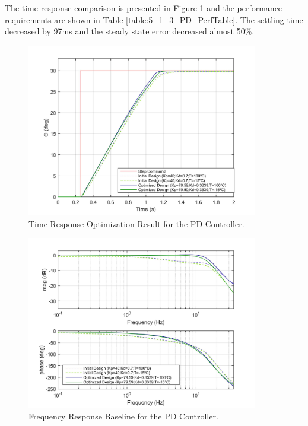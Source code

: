 The time response comparison is presented in Figure \ref{fig:5_1_3_PD_TimeResp} and the performance requirements are shown in Table \ref{table:5_1_3_PD_PerfTable}. The settling time decreased by 97ms and the steady state error decreased almost 50\%.

\begin{figure}[H]
	\centering
	\centerline{\includegraphics[width=0.9\textwidth]{Figuras/5.OptimizationResults/5-1-3-PD-TimeResponseComparison.jpg}}
	\caption{Time Response Optimization Result for the PD Controller.}
	\label{fig:5_1_3_PD_TimeResp}
\end{figure}

\begin{figure}[H]
	\centering
	\centerline{\includegraphics[width=0.9\textwidth]{Figuras/5.OptimizationResults/5-1-3-PD-FrequencyResponseComparison.jpg}}
	\caption{Frequency Response Baseline for the PD Controller.}
	\label{fig:5_1_3_PD_FreqResp}
\end{figure}

